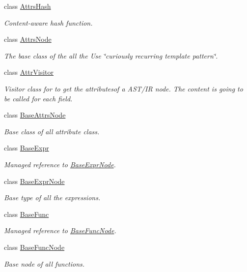 \begin{DoxyCompactItemize}
class \hyperlink{classtvm_1_1AttrsHash}{Attrs\+Hash}
\begin{DoxyCompactList}\small\item\em Content-\/aware hash function. \end{DoxyCompactList}\item 
class \hyperlink{classtvm_1_1AttrsNode}{Attrs\+Node}
\begin{DoxyCompactList}\small\item\em The base class of the all the Use \char`\"{}curiously recurring template pattern\char`\"{}. \end{DoxyCompactList}\item 
class \hyperlink{classtvm_1_1AttrVisitor}{Attr\+Visitor}
\begin{DoxyCompactList}\small\item\em Visitor class for to get the attributesof a A\+S\+T/\+IR node. The content is going to be called for each field. \end{DoxyCompactList}\item 
class \hyperlink{classtvm_1_1BaseAttrsNode}{Base\+Attrs\+Node}
\begin{DoxyCompactList}\small\item\em Base class of all attribute class. \end{DoxyCompactList}\item 
class \hyperlink{classtvm_1_1BaseExpr}{Base\+Expr}
\begin{DoxyCompactList}\small\item\em Managed reference to \hyperlink{classtvm_1_1BaseExprNode}{Base\+Expr\+Node}. \end{DoxyCompactList}\item 
class \hyperlink{classtvm_1_1BaseExprNode}{Base\+Expr\+Node}
\begin{DoxyCompactList}\small\item\em Base type of all the expressions. \end{DoxyCompactList}\item 
class \hyperlink{classtvm_1_1BaseFunc}{Base\+Func}
\begin{DoxyCompactList}\small\item\em Managed reference to \hyperlink{classtvm_1_1BaseFuncNode}{Base\+Func\+Node}. \end{DoxyCompactList}\item 
class \hyperlink{classtvm_1_1BaseFuncNode}{Base\+Func\+Node}
\begin{DoxyCompactList}\small\item\em Base node of all functions. \end{DoxyCompactList}\item 

\end{DoxyCompactItemize}
